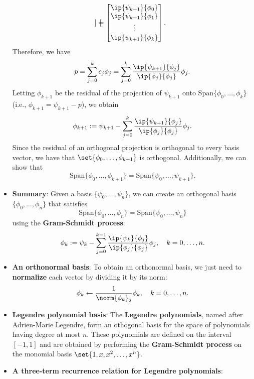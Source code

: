\documentclass{report}
\begin{document}
\begin{itemize}
$$\begin{bmatrix}
            \end{bmatrix} = 
            \begin{bmatrix}
                \ip{\psi_{k+1}}{\phi_0}\\
                \ip{\psi_{k+1}}{\phi_1}\\
                \vdots\\
                \ip{\psi_{k+1}}{\phi_k}\\
            \end{bmatrix}.
            $$
            Therefore, we have
            $$p = \sum_{j=0}^k c_j\phi_j = \sum_{j=0}^k \frac{\ip{\psi_{k+1}}{\phi_j}}{\ip{\phi_j}{\phi_j}} \phi_j.$$
            \bigbreak \noindent 
            Letting $\phi_{k+1}$ be the residual of the projection of $\psi_{k+1}$ onto $\text{Span}\{\phi_0,\ldots,\phi_k\}$ (i.e., $\phi_{k+1} = \psi_{k+1} - p$), we obtain
            $${\displaystyle \phi_{k+1} := \psi_{k+1} - \sum_{j=0}^k \frac{\ip{\psi_{k+1}}{\phi_j}}{\ip{\phi_j}{\phi_j}} \phi_j.}$$
            Since the residual of an orthogonal projection is orthogonal to every basis vector, we have that $\set{\phi_0,\ldots,\phi_{k+1}}$ is orthogonal.
            \bigbreak \noindent 
            Additionally, we can show that
            $$\text{Span}\{\phi_0,\ldots,\phi_{k+1}\} = \text{Span}\{\psi_0,\ldots,\psi_{k+1}\}.$$
        \item \textbf{Summary}:
            Given a basis $\{\psi_0,\ldots,\psi_n\}$, we can create an orthogonal basis $\{\phi_0,\ldots,\phi_n\}$ that satisfies
            $$\text{Span}\{\phi_0,\ldots,\phi_n\} = \text{Span}\{\psi_0,\ldots,\psi_n\}$$
            using the \textbf{Gram-Schmidt process}:
            $$ \displaystyle \phi_{k} := \psi_{k} - \sum_{j=0}^{k-1} \frac{\ip{\psi_{k}}{\phi_j}}{\ip{\phi_j}{\phi_j}} \phi_j, \quad k=0,\ldots,n. $$
        \item \textbf{An orthonormal basis}:
            To obtain an orthonormal basis, we just need to \textbf{normalize} each vector by dividing it by its norm:
$$\phi_k \gets \frac{1}{\norm{\phi_k}_2}\phi_k, \quad k=0,\ldots,n.$$
    \item \textbf{Legendre polynomial basis}:
        The \textbf{Legendre polynomials}, named after Adrien-Marie Legendre, form an othogonal basis for the space of polynomials having degree at most $n$.
        These polynomials are defined on the interval $[-1,1]$ and are obtained by performing the \textbf{Gram-Schmidt process} on the monomial basis $\set{1,x,x^2,\ldots,x^n}$.
    \item \textbf{A three-term recurrence relation for Legendre polynomials}:

\end{itemize}
\end{document}
